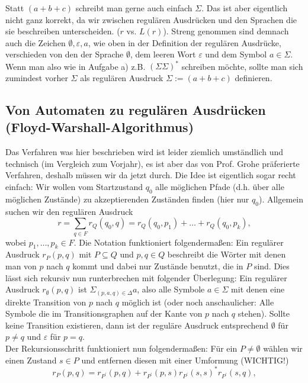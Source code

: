 \documentclass[11pt, a4paper]{article}
\begin{document}
Statt \( (a+b+c) \) schreibt man gerne auch einfach \( \Sigma \). Das ist aber eigentlich nicht ganz korrekt, da wir zwischen regulären Ausdrücken und den Sprachen die sie beschreiben unterscheiden. (\( r \) vs. \( L(r) \)). Streng genommen sind demnach auch die Zeichen \( \emptyset, \varepsilon, a \), wie oben in der Definition der regulären Ausdrücke, verschieden von den der Sprache \( \emptyset \), dem leeren Wort \( \varepsilon \) und dem Symbol \( a \in \Sigma \). Wenn man also wie in Aufgabe a) z.B. \( (\Sigma\Sigma)^\ast \) schreiben möchte, sollte man sich zumindest vorher \( \Sigma \) als regulären Ausdruck \( \Sigma := (a+b+c) \) definieren.


\subsection*{Von Automaten zu regulären Ausdrücken (Floyd-Warshall-Algorithmus)}
Das Verfahren was hier beschrieben wird ist leider ziemlich umständlich und technisch (im Vergleich zum Vorjahr), es ist aber das von Prof. Grohe präferierte Verfahren, deshalb müssen wir da jetzt durch. Die Idee ist eigentlich sogar recht einfach: Wir wollen vom Startzustand \( q_0 \) alle möglichen Pfade (d.h. über alle möglichen Zustände) zu akzeptierenden Zuständen finden (hier nur \( q_0 \)). Allgemein suchen wir den regulären Ausdruck
\[
	r = \sum_{q \in F} r_Q(q_0, q) = r_Q(q_0, p_1) + \ldots + r_Q(q_0, p_k),
\]
wobei \( p_1, \ldots, p_k \in F \). Die Notation funktioniert folgendermaßen: Ein regulärer Ausdruck \( r_P(p, q) \) mit \( P \subseteq Q \) und \( p, q \in Q \) beschreibt die Wörter mit denen man von \( p \) nach \( q \) kommt und dabei nur Zustände benutzt, die in \( P \) sind. Dies lässt sich rekursiv nun runterbrechen mit folgender Überlegung: Ein regulärer Ausdruck \( r_\emptyset(p, q) \) ist \( \Sigma_{(p, a, q) \in \Delta} a \), also alle Symbole \( a \in \Sigma \) mit denen eine direkte Transition von \( p \) nach \( q \) möglich ist (oder noch anschaulicher: Alle Symbole die im Transitionsgraphen auf der Kante von \( p \) nach \( q \) stehen). Sollte keine Transition existieren, dann ist der reguläre Ausdruck entsprechend \( \emptyset \) für \( p \neq q \) und \( \varepsilon \) für \( p = q \).\\
Der Rekursionsschritt funktioniert nun folgendermaßen: Für ein \( P \neq \emptyset \) wählen wir einen Zustand  \( s \in P \) und entfernen diesen mit einer Umformung (WICHTIG!)
\[
	r_P(p, q) = r_{P^\prime}(p, q) + r_{P^\prime}(p, s) r_{P^\prime}(s, s)^\ast r_{P^\prime}(s, q),
\]
\end{document}
